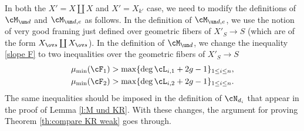 In both the $X'=X\coprod X$ and $X'=X_{k'}$ case, we need to modify the definitions of $\cM_{\un d}$ and $\cM_{\un d,e}$ as follows. In the definition of $\cM_{\un d,e}$, we use the notion of very good framing just defined over geometric fibers of $X'_{S}\to S$ (which are of the form $X_{\ov s}\coprod X_{\ov s}$).  In the definition of $\cM_{\un d}$, we change the inequality \eqref{slope F} to two inequalities over the geometric fibers of $X'_{S}\to S$
\begin{eqnarray*}
\mu_{\min}(\cF_{1})>\max\{\deg\cL_{i,1}+2g-1\}_{1\le i\le n},\\
\mu_{\min}(\cF_{2})>\max\{\deg\cL_{i,2}+2g-1\}_{1\le i\le n}.
\end{eqnarray*}
The same inequalities should be imposed in the definition of $\cN_{d_{i}}$ that appear in the proof of Lemma \ref{l:M und KR}. With these changes, the argument for proving Theorem \ref{th:compare KR weak} goes through.
